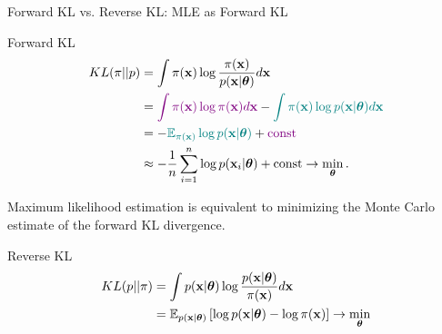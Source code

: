 \documentclass{beamer}
\begin{document}
\begin{frame}{Forward KL vs. Reverse KL: MLE as Forward KL}
	\begin{block}{Forward KL}
		\vspace{-0.5cm}
		\begin{align*}
			KL(\pi || p) &= \int \pi(\mathbf{x}) \log \frac{\pi(\mathbf{x})}{p(\mathbf{x} | \boldsymbol{\theta})} d\mathbf{x} \\
			&= {\color{violet}\int \pi (\mathbf{x}) \log \pi(\mathbf{x}) d \mathbf{x}} - {\color{teal}\int \pi (\mathbf{x}) \log p(\mathbf{x} | \boldsymbol{\theta}) d \mathbf{x}} \\
			&= - {\color{teal}\mathbb{E}_{\pi(\mathbf{x})} \log p(\mathbf{x} | \boldsymbol{\theta})} + {\color{violet}\text{const}} \\
			& \approx - \frac{1}{n} \sum_{i=1}^n \log p(\mathbf{x}_i | \boldsymbol{\theta}) + \text{const} \rightarrow \min_{\boldsymbol{\theta}}.
		\end{align*}
		\vspace{-0.5cm}
	\end{block}
	Maximum likelihood estimation is equivalent to minimizing the Monte Carlo estimate of the forward KL divergence.
	\begin{block}{Reverse KL}
		\vspace{-0.5cm}
		\begin{align*}
			KL(p || \pi) &= \int p(\mathbf{x} | \boldsymbol{\theta}) \log \frac{p(\mathbf{x} | \boldsymbol{\theta})}{\pi(\mathbf{x})} d \mathbf{x} \\
			&= \mathbb{E}_{p(\mathbf{x} | \boldsymbol{\theta})} \left[\log p(\mathbf{x} | \boldsymbol{\theta}) - \log \pi(\mathbf{x})\right] \rightarrow \min_{\boldsymbol{\theta}}
		\end{align*}
		\vspace{-0.7cm}
	\end{block}
\end{frame}
\end{document}
